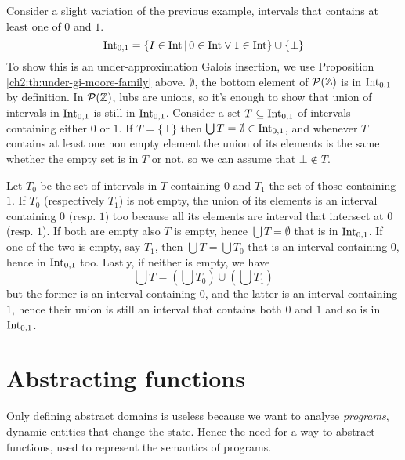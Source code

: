\begin{example}
	Consider a slight variation of the previous example, intervals that contains at least one of $0$ and $1$.
	\[
	\text{Int}_{0,1} = \{ I \in \text{Int} \,\vert\, 0 \in \text{Int} \lor 1 \in \text{Int} \} \cup \{ \bot \}
	\]
	To show this is an under-approximation Galois insertion, we use Proposition \ref{ch2:th:under-gi-moore-family} above.
	$\emptyset$, the bottom element of $\mathcal{P}(\mathbb{Z})$ is in $\text{Int}_{0,1}$ by definition. In $\mathcal{P}(\mathbb{Z})$, lubs are unions, so it's enough to show that union of intervals in $\text{Int}_{0,1}$ is still in $\text{Int}_{0,1}$.
	Consider a set $T \subseteq \text{Int}_{0,1}$ of intervals containing either $0$ or $1$. If $T = \{ \bot \}$ then $\bigcup T = \emptyset \in \text{Int}_{0,1}$, and whenever $T$ contains at least one non empty element the union of its elements is the same whether the empty set is in $T$ or not, so we can assume that $\bot \notin T$.

	Let $T_0$ be the set of intervals in $T$ containing $0$ and $T_1$ the set of those containing $1$. If $T_0$ (respectively $T_1$) is not empty, the union of its elements is an interval containing $0$ (resp. $1$) too because all its elements are interval that intersect at $0$ (resp. $1$). If both are empty also $T$ is empty, hence $\bigcup T = \emptyset$ that is in $\text{Int}_{0,1}$. If one of the two is empty, say $T_1$, then $\bigcup T = \bigcup T_0$ that is an interval containing $0$, hence in $\text{Int}_{0,1}$ too. Lastly, if neither is empty, we have
	\[
	\bigcup T = \left( \bigcup T_0 \right) \cup \left( \bigcup T_1 \right)
	\]
	but the former is an interval containing $0$, and the latter is an interval containing $1$, hence their union is still an interval that contains both $0$ and $1$ and so is in $\text{Int}_{0,1}$.
\end{example}

\section{Abstracting functions}
Only defining abstract domains is useless because we want to analyse \textit{programs}, dynamic entities that change the state. Hence the need for a way to abstract functions, used to represent the semantics of programs.

